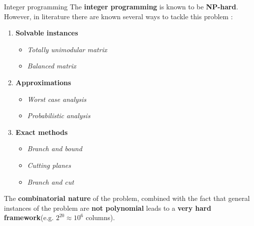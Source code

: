 \documentclass[aspectratio=169,xcolor=dvipsnames]{beamer}
\begin{document}
    \begin{frame}{Integer programming}
    The \textbf{integer programming} is known to be \textbf{NP-hard}. However, in literature there are known several ways to tackle this problem : 
\pause
    \begin{enumerate}
        \item \textbf{Solvable instances} 
            \begin{itemize}
            \item \textit{Totally unimodular matrix}
            \item \textit{Balanced matrix}
            \end{itemize}
\pause
        \item \textbf{Approximations}
         \begin{itemize}
            \item \textit{Worst case analysis}
            \item \textit{Probabilistic analysis}
            \end{itemize}
\pause
        \item \textbf{Exact methods}
         \begin{itemize}
            \item \textit{Branch and bound}
            \item \textit{Cutting planes}
            \item \textit{Branch and cut}
            \end{itemize}
    \end{enumerate}    
\pause
    The \textbf{combinatorial nature} of the problem, combined with the fact that general instances of the problem are \textbf{not polynomial} leads to a \textbf{very hard framework}(e.g. $2^{20} \approx 10^6$ columns).
    \end{frame}
    
\end{document}
